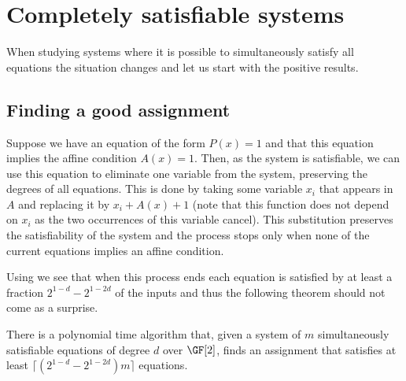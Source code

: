 \section{Completely satisfiable systems}\label{sec: p}

When studying systems where it is possible
to simultaneously satisfy all equations
the situation changes and let us start with
the positive results.

\subsection{Finding a good assignment}

Suppose we have an
equation of the form
$P(x)=1$ and that
this equation implies the affine
condition $A(x)=1$.  Then,
as the system is satisfiable,
we can use this equation to eliminate
one variable from the system, preserving the
degrees of all equations.  This is done
by taking some variable $x_i$ that appears
in $A$ and replacing it by $x_i+A(x)+1$ (note that
this function does not depend on $x_i$ as the two
occurrences of this variable cancel).
This substitution preserves the satisfiability of the
system and the process stops only 
when none of the current equations implies an affine condition.

Using  we see
that when this process ends each equation
is satisfied by at least a fraction
$2^{1-d}-2^{1-2d}$ of the inputs and thus the following
theorem should not come as a surprise.

\begin{theorem}\label{thm upper sat}
There is a polynomial time algorithm that,
given a system of $m$ simultaneously satisfiable equations
of degree $d$ over $\GF[2]$, finds an
assignment that satisfies at least
$\lceil (2^{1-d}-2^{1-2d})m\rceil$ equations.
\end{theorem}


